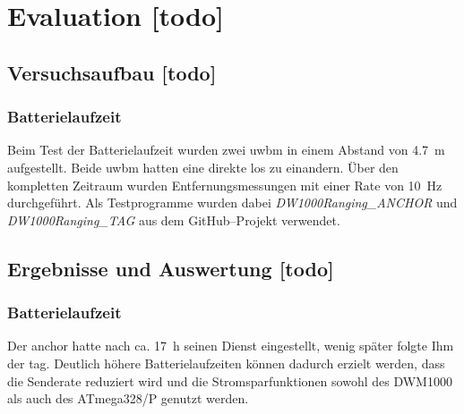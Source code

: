 \begin{comment}
------------------------------------------------------------------------------------------
\end{comment}
\chapter{Evaluation [todo]}


\begin{comment}
------------------------------------------------------------------------------------------
\end{comment}
\section{Versuchsaufbau [todo]}


\begin{comment}
------------------------------------------------------------------------------------------
TODO: Stimmen die 10Hz?
\end{comment}
\subsection{Batterielaufzeit}

Beim Test der Batterielaufzeit wurden zwei \gls{uwbm} in einem Abstand von \SI{4.7}{\metre} aufgestellt. Beide \gls{uwbm} hatten eine direkte \gls{los} zu einandern. Über den kompletten Zeitraum wurden Entfernungsmessungen mit einer Rate von \SI{10}{\hertz} durchgeführt. Als Testprogramme wurden dabei \textit{DW1000Ranging\_ANCHOR} und \textit{DW1000Ranging\_TAG} aus dem GitHub--Projekt \cite{Trojer2015} verwendet.


\begin{comment}
------------------------------------------------------------------------------------------
\end{comment}
\section{Ergebnisse und Auswertung [todo]}


\begin{comment}
------------------------------------------------------------------------------------------
- Start 13:50-23:50, 12:50-20:00 => 10+7 => 17 Stunden
\end{comment}
\subsection{Batterielaufzeit}

Der \gls{anchor} hatte nach ca. \SI{17}{\hour} seinen Dienst eingestellt, wenig später folgte Ihm der \gls{tag}. Deutlich höhere Batterielaufzeiten können dadurch erzielt werden, dass die Senderate reduziert wird und die Stromsparfunktionen sowohl des DWM1000 als auch des ATmega328/P genutzt werden.